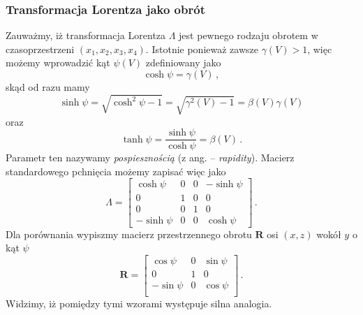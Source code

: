 \documentclass[../main.tex]{subfiles}
\begin{document}
\subsubsection{Transformacja Lorentza jako obrót}
Zauważmy, iż transformacja Lorentza \(\Lambda\) jest pewnego rodzaju obrotem w czasoprzestrzeni \((x_1,x_2,x_3,x_4)\). Istotnie ponieważ zawsze \(\gamma(V)>1\), więc możemy wprowadzić kąt \(\psi(V)\) zdefiniowany jako
\begin{equation*}
    \cosh\psi=\gamma(V)\,,
\end{equation*}
skąd od razu mamy
\begin{equation*}
    \sinh\psi=\sqrt{\cosh^2\psi-1}=\sqrt{\gamma^2(V)-1}=\beta(V)\gamma(V)
\end{equation*}
oraz
\begin{equation*}
    \tanh\psi=\frac{\sinh\psi}{\cosh\psi}=\beta(V)\,.
\end{equation*}
Parametr ten nazywamy \textit{pospiesznością} (z ang. -- \textit{rapidity}). Macierz standardowego pchnięcia możemy zapisać więc jako
\begin{equation*}
    \Lambda=\left[\begin{array}{cccc}
         \cosh\psi&0&0&-\sinh\psi \\
         0&1&0&0  \\
         0&0&1&0  \\
         -\sinh\psi &0&0&\cosh\psi
    \end{array}\right]\,.
\end{equation*}
Dla porównania wypiszmy macierz przestrzennego obrotu \(\mathbf{R}\) osi \((x,z)\) wokół \(y\) o kąt \(\psi\)
\begin{equation*}
    \mathbf{R}=\left[\begin{array}{ccc}
         \cos\psi&0&\sin\psi  \\
         0&1&0  \\
         -\sin\psi&0&\cos\psi  \\
    \end{array}\right]\,.
\end{equation*}
Widzimy, iż pomiędzy tymi wzorami występuje silna analogia.
\end{document}
